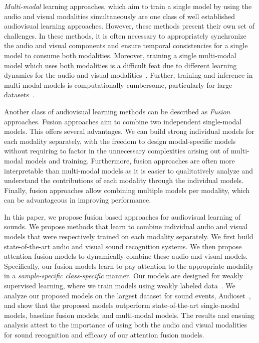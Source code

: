 \documentclass{article}
\begin{document}
\emph{Multi-modal} learning approaches, which aim to train a single model by using the audio and visual modalities simultaneously are one class of well established audiovisual learning approaches. However, these methods present their own set of challenges. In these methods, it is often necessary to appropriately synchronize the audio and visual components and ensure temporal consistencies for a single model to consume both modalities.
Moreover, training a single multi-modal model which uses both modalities is a difficult feat due to different learning dynamics for the audio and visual modalities~\cite{Wang2019}.
Further, training and inference in multi-modal models is computationally cumbersome, particularly for large datasets~\cite{Gao2019}.

Another class of audiovisual learning methods can be described as \emph{Fusion} approaches. 
Fusion approaches aim to combine two independent single-modal models.
This offers several advantages.
We can build strong individual models for each modality separately, with the freedom to design modal-specific models without requiring to factor in the unnecessary complexities arising out of multi-modal models and training.
Furthermore, fusion approaches are often more interpretable than multi-modal models as it is easier to qualitatively analyze and understand the contributions of each modality through the individual models.
Finally, fusion approaches allow combining multiple models per modality, which can be advantageous in improving performance.

In this paper, we propose fusion based approaches for audiovisual learning of sounds. We propose methods that learn to combine individual audio and visual models that were respectively trained on each modality separately.
We first build state-of-the-art audio and visual sound recognition systems.
We then propose attention fusion models to dynamically combine these audio and visual models.
Specifically, our fusion models learn to pay attention to the appropriate modality in a \emph{sample-specific} \emph{class-specific} manner.
Our models are designed for weakly supervised learning, where we train models using weakly labeled data~\cite{Kumar2016}.
We analyze our proposed models on the largest dataset for sound events, Audioset~\cite{Gemmeke2017}, and show that the proposed models outperform state-of-the-art single-modal models, baseline fusion models, and multi-modal models.
The results and ensuing analysis attest to the importance of using both the audio and visual modalities for sound recognition and efficacy of our attention fusion models.
\end{document}
